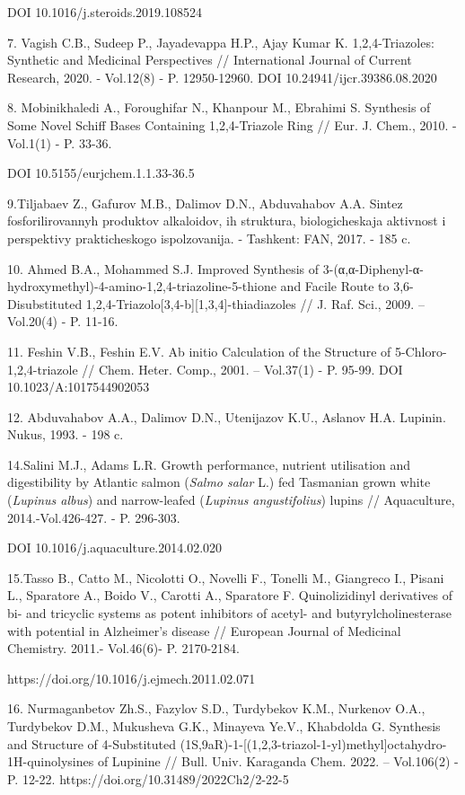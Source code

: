 DOI 10.1016/j.steroids.2019.108524

7. Vagish C.B., Sudeep P., Jayadevappa H.P., Ajay Kumar K.
1,2,4-Triazoles: Synthetic and Medicinal Perspectives // International
Journal of Current Research, 2020. - Vol.12(8) - P. 12950-12960. DOI
10.24941/ijcr.39386.08.2020

8. Mobinikhaledi A., Foroughifar N., Khanpour M., Ebrahimi S. Synthesis
of Some Novel Schiff Bases Containing 1,2,4-Triazole Ring // Eur. J.
Chem., 2010. -Vol.1(1) - P. 33-36.

DOI 10.5155/eurjchem.1.1.33-36.5

9.Tiljabaev Z., Gafurov M.B., Dalimov D.N., Abduvahabov A.A. Sintez
fosforilirovannyh produktov alkaloidov, ih struktura, biologicheskaja
aktivnost\textquotesingle{} i perspektivy prakticheskogo
ispol\textquotesingle zovanija. - Tashkent: FAN, 2017. - 185 c.

10. Ahmed B.A., Mohammed S.J. Improved Synthesis of
3-(α,α-Diphenyl-α-hydroxymethyl)-4-amino-1,2,4-triazoline-5-thione and
Facile Route to 3,6-Disubstituted
1,2,4-Triazolo{[}3,4-b{]}{[}1,3,4{]}-thiadiazoles // J. Raf. Sci., 2009.
-- Vol.20(4) - P. 11-16.

11. Feshin V.B., Feshin E.V. Ab initio Calculation of the Structure of
5-Chloro-1,2,4-triazole // Chem. Heter. Comp., 2001. -- Vol.37(1) - P.
95-99. DOI 10.1023/A:1017544902053

12. Abduvahabov A.A., Dalimov D.N., Utenijazov K.U., Aslanov H.A.
Lupinin. Nukus, 1993. - 198 c.

14.Salini M.J., Adams L.R. Growth performance, nutrient utilisation and
digestibility by Atlantic salmon (\emph{Salmo salar} L.) fed Tasmanian
grown white (\emph{Lupinus albus}) and narrow-leafed (\emph{Lupinus}
\emph{angustifolius}) lupins // Aquaculture, 2014.-Vol.426-427. - P.
296-303.

DOI 10.1016/j.aquaculture.2014.02.020

15.Tasso B., Catto M., Nicolotti O., Novelli F., Tonelli M., Giangreco
I., Pisani L., Sparatore A., Boido V., Carotti A., Sparatore F.
Quinolizidinyl derivatives of bi- and tricyclic systems as potent
inhibitors of acetyl- and butyrylcholinesterase with potential in
Alzheimer's disease // European Journal of Medicinal Chemistry. 2011.-
Vol.46(6)- P. 2170-2184.

https://doi.org/10.1016/j.ejmech.2011.02.071

16. Nurmaganbetov Zh.S., Fazylov S.D., Turdybekov K.M., Nurkenov O.A.,
Turdybekov D.M., Mukusheva G.K., Minayeva Ye.V., Khabdolda G. Synthesis
and Structure of 4-Substituted
(1S,9aR)-1-{[}(1,2,3-triazol-1-yl)methyl{]}octahydro-1H-quinolysines of
Lupinine // Bull. Univ. Karaganda Chem. 2022. -- Vol.106(2) - P. 12-22.
https://doi.org/10.31489/2022Ch2/2-22-5

